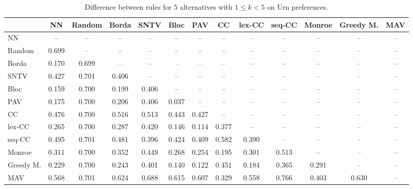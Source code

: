 
\begin{table*}[h!]
\centering
\begin{tabular}{lcccccccccccc}
\toprule
 & NN & Random & Borda & SNTV & Bloc & PAV & CC & lex-CC & seq-CC & Monroe & Greedy M. & MAV \\
\midrule
NN & -- & -- & -- & -- & -- & -- & -- & -- & -- & -- & -- & -- \\
Random & 0.699 & -- & -- & -- & -- & -- & -- & -- & -- & -- & -- & -- \\
Borda & 0.170 & 0.699 & -- & -- & -- & -- & -- & -- & -- & -- & -- & -- \\
SNTV & 0.427 & 0.701 & 0.406 & -- & -- & -- & -- & -- & -- & -- & -- & -- \\
Bloc & 0.159 & 0.700 & 0.199 & 0.406 & -- & -- & -- & -- & -- & -- & -- & -- \\
PAV & 0.175 & 0.700 & 0.206 & 0.406 & 0.037 & -- & -- & -- & -- & -- & -- & -- \\
CC & 0.476 & 0.700 & 0.516 & 0.513 & 0.443 & 0.427 & -- & -- & -- & -- & -- & -- \\
lex-CC & 0.265 & 0.700 & 0.287 & 0.420 & 0.146 & 0.114 & 0.377 & -- & -- & -- & -- & -- \\
seq-CC & 0.495 & 0.701 & 0.481 & 0.396 & 0.424 & 0.409 & 0.582 & 0.390 & -- & -- & -- & -- \\
Monroe & 0.311 & 0.700 & 0.352 & 0.449 & 0.268 & 0.254 & 0.195 & 0.301 & 0.513 & -- & -- & -- \\
Greedy M. & 0.229 & 0.700 & 0.243 & 0.401 & 0.140 & 0.122 & 0.451 & 0.184 & 0.365 & 0.291 & -- & -- \\
MAV & 0.568 & 0.701 & 0.624 & 0.688 & 0.615 & 0.607 & 0.329 & 0.558 & 0.766 & 0.403 & 0.630 & -- \\
\bottomrule
\end{tabular}

\caption{Difference between rules for 5 alternatives with $1 \leq k < 5$ on Urn preferences.}
\end{table*}
